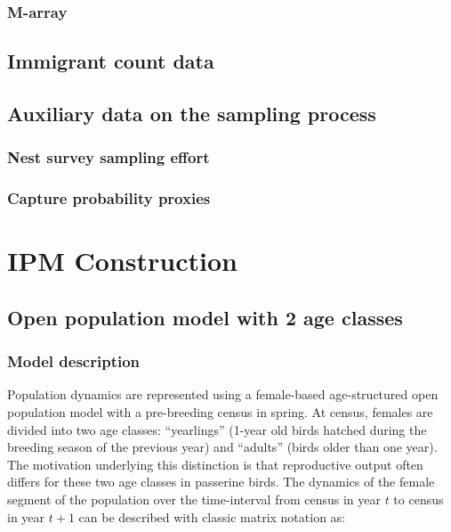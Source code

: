 \documentclass[
]{book}
\begin{document}
\hypertarget{m-array}{%
\subsection{M-array}\label{m-array}}

\hypertarget{immigrant-count-data}{%
\section{Immigrant count data}\label{immigrant-count-data}}

\hypertarget{auxiliary-data-on-the-sampling-process}{%
\section{Auxiliary data on the sampling process}\label{auxiliary-data-on-the-sampling-process}}

\hypertarget{nest-survey-sampling-effort}{%
\subsection{Nest survey sampling effort}\label{nest-survey-sampling-effort}}

\hypertarget{capture-probability-proxies}{%
\subsection{Capture probability proxies}\label{capture-probability-proxies}}

\hypertarget{IPMCon}{%
\chapter{IPM Construction}\label{IPMCon}}

\hypertarget{open-population-model-with-2-age-classes}{%
\section{Open population model with 2 age classes}\label{open-population-model-with-2-age-classes}}

\hypertarget{model-description}{%
\subsection{Model description}\label{model-description}}

Population dynamics are represented using a female-based age-structured open
population model with a pre-breeding census in spring. At census, females are
divided into two age classes: ``yearlings'' (1-year old birds hatched during the
breeding season of the previous year) and ``adults'' (birds older than one year).
The motivation underlying this distinction is that reproductive output often
differs for these two age classes in passerine birds.
The dynamics of the female segment of the population over the time-interval from
census in year \(t\) to census in year \(t+1\) can be described with classic matrix
notation \citep{Caswell2001} as:
\end{document}
